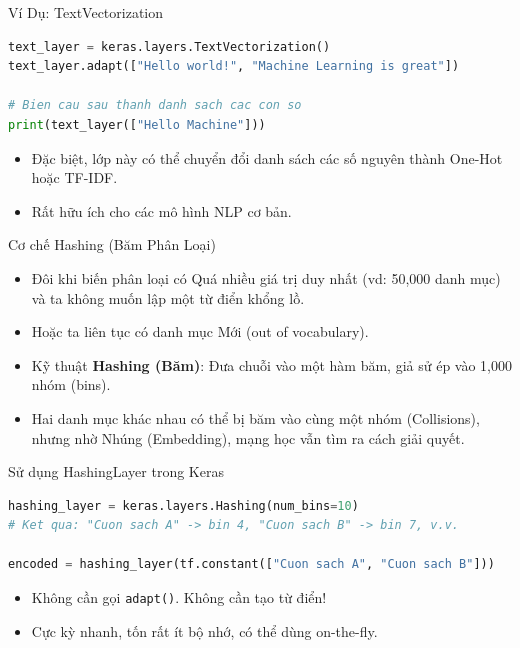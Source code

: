 \documentclass[aspectratio=169]{beamer}
\begin{document}
\begin{frame}[fragile]{Ví Dụ: TextVectorization}
\begin{lstlisting}[language=Python]
text_layer = keras.layers.TextVectorization()
text_layer.adapt(["Hello world!", "Machine Learning is great"])

# Bien cau sau thanh danh sach cac con so
print(text_layer(["Hello Machine"]))
\end{lstlisting}
    \begin{itemize}
        \item Đặc biệt, lớp này có thể chuyển đổi danh sách các số nguyên thành One-Hot hoặc TF-IDF.
        \item Rất hữu ích cho các mô hình NLP cơ bản.
    \end{itemize}
\end{frame}

\begin{frame}{Cơ chế Hashing (Băm Phân Loại)}
    \begin{itemize}
        \item Đôi khi biến phân loại có Quá nhiều giá trị duy nhất (vd: 50,000 danh mục) và ta không muốn lập một từ điển khổng lồ.
        \item Hoặc ta liên tục có danh mục Mới (out of vocabulary).
        \item Kỹ thuật \textbf{Hashing (Băm)}: Đưa chuỗi vào một hàm băm, giả sử ép vào 1,000 nhóm (bins).
        \item Hai danh mục khác nhau có thể bị băm vào cùng một nhóm (Collisions), nhưng nhờ Nhúng (Embedding), mạng học vẫn tìm ra cách giải quyết.
    \end{itemize}
\end{frame}

\begin{frame}[fragile]{Sử dụng HashingLayer trong Keras}
\begin{lstlisting}[language=Python]
hashing_layer = keras.layers.Hashing(num_bins=10)
# Ket qua: "Cuon sach A" -> bin 4, "Cuon sach B" -> bin 7, v.v.

encoded = hashing_layer(tf.constant(["Cuon sach A", "Cuon sach B"]))
\end{lstlisting}
    \begin{itemize}
        \item Không cần gọi \texttt{adapt()}. Không cần tạo từ điển!
        \item Cực kỳ nhanh, tốn rất ít bộ nhớ, có thể dùng on-the-fly.
    \end{itemize}
\end{frame}
\end{document}
